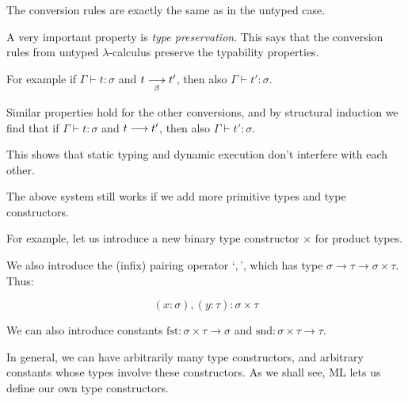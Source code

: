 \begin{slide*}


\vspace*{0.5cm}

The conversion rules are exactly the same as in the untyped case.

A very important property is {\em type preservation}. This says that the
conversion rules from untyped $\lambda$-calculus preserve the typability
properties.

For example if {\red $\Gamma \vdash t : \sigma$} and {\red $t \mathrel{\mathop{\longrightarrow}\limits_{\beta}} t'$}, then
also {\red $\Gamma \vdash t' : \sigma$}.

Similar properties hold for the other conversions, and by structural induction
we find that if {\red $\Gamma \vdash t : \sigma$} and {\red $t \longrightarrow t'$},
then also {\red $\Gamma \vdash t' : \sigma$}.

This shows that static typing and dynamic execution don't interfere with each
other.

\end{slide*}



\begin{slide*}


\vspace*{0.5cm}

The above system still works if we add more primitive types and type
constructors.

For example, let us introduce a new binary type constructor {\red $\times$}
for product types.

We also introduce the (infix) pairing operator `{\red$,$}', which has type
{\red $\sigma \to \tau \to \sigma \times \tau$}. Thus:

{\red $$ (x:\sigma),(y:\tau) : \sigma \times \tau $$}

We can also introduce constants {\red $\mbox{fst}:\sigma \times \tau \to
\sigma$} and {\red $\mbox{snd}:\sigma \times \tau \to \tau$}.

In general, we can have arbitrarily many type constructors, and arbitrary
constants whose types involve these constructors. As we shall see, ML lets us
define our own type constructors.

\end{slide*}



